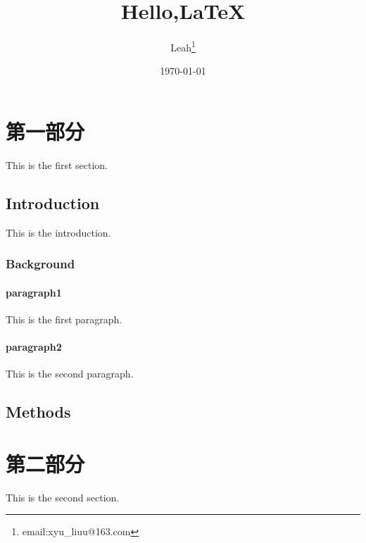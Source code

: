 \documentclass{ctexart} %
\title{Hello,\LaTeX}
\author{Leah\thanks{email:xyu_liuu@163.com}}
\date{\today}
\begin{document}
\maketitle
\tableofcontents

\section{第一部分}
This is the first section.
\subsection{Introduction}
This is the introduction.

\subsubsection{Background}
\paragraph{paragraph1} This is the first paragraph.
\paragraph{paragraph2} This is the second paragraph.

\subsection{Methods}


\section{第二部分}
This is the second section.
\end{document}
